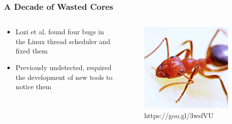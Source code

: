 \documentclass{beamer}
\newcommand{\linespace}{\vskip 0.25cm}
\begin{document}
\begin{frame}
\frametitle{A Decade of Wasted Cores}

\begin{columns}
\begin{column}{0.72\textwidth}
\begin{itemize}
\item Lozi et al. found four bugs in the Linux thread scheduler and fixed them~\cite{Lozi:2016}

\linespace

\item Previously undetected, required the development of new tools to notice them

\end{itemize}
\end{column}
\begin{column}{0.28\textwidth} %
\begin{figure}
\centering
\includegraphics[width=0.95\textwidth]{Illustrations/ant_from_pexels.png}
\caption*{https://goo.gl/3wsfVU}
\end{figure}

\end{column}
\end{columns}

\end{frame}
\end{document}
